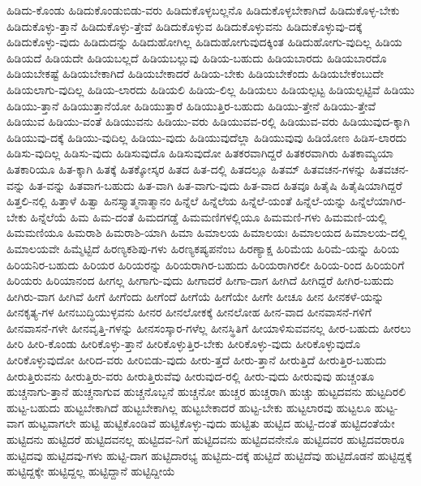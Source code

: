 {ಹಿಡಿದು-ಕೊಂಡು
ಹಿಡಿದುಕೊಂಡುಬಿಡು-ವರು
ಹಿಡಿದುಕೊಳ್ಳಬಲ್ಲನೊ
ಹಿಡಿದುಕೊಳ್ಳಬೇಕಾಗಿದೆ
ಹಿಡಿದುಕೊಳ್ಳ-ಬೇಕು
ಹಿಡಿದುಕೊಳ್ಳು-ತ್ತಾನೆ
ಹಿಡಿದುಕೊಳ್ಳು-ತ್ತೇವೆ
ಹಿಡಿದುಕೊಳ್ಳುವ
ಹಿಡಿದುಕೊಳ್ಳುವನು
ಹಿಡಿದುಕೊಳ್ಳುವು-ದಕ್ಕೆ
ಹಿಡಿದುಕೊಳ್ಳು-ವುದು
ಹಿಡಿದುದನ್ನು
ಹಿಡಿದುಹೋಗಿಲ್ಲ
ಹಿಡಿದುಹೋಗುವುದಕ್ಕಿಂತ
ಹಿಡಿದುಹೋಗು-ವುದಿಲ್ಲ
ಹಿಡಿಯ
ಹಿಡಿಯದೆ
ಹಿಡಿಯದೇ
ಹಿಡಿಯಬಲ್ಲದೆ
ಹಿಡಿಯಬಲ್ಲುವು
ಹಿಡಿಯ-ಬಹುದು
ಹಿಡಿಯಬಾರದು
ಹಿಡಿಯಬಾರದೊ
ಹಿಡಿಯಬೇಕಷ್ಟೆ
ಹಿಡಿಯಬೇಕಾಗಿದೆ
ಹಿಡಿಯಬೇಕಾದರೆ
ಹಿಡಿಯ-ಬೇಕು
ಹಿಡಿಯಬೇಕೆಂದು
ಹಿಡಿಯಬೇಕೆಂಬುದೇ
ಹಿಡಿಯಲಾಗು-ವುದಿಲ್ಲ
ಹಿಡಿಯ-ಲಾರದು
ಹಿಡಿಯಲಿ
ಹಿಡಿಯ-ಲಿಲ್ಲ
ಹಿಡಿಯಲು
ಹಿಡಿಯಲ್ಪಟ್ಟ
ಹಿಡಿಯಲ್ಪಟ್ಟಿವೆ
ಹಿಡಿಯು
ಹಿಡಿಯು-ತ್ತಾನೆ
ಹಿಡಿಯುತ್ತಾನೆಯೋ
ಹಿಡಿಯುತ್ತಾರೆ
ಹಿಡಿಯುತ್ತಿರ-ಬಹುದು
ಹಿಡಿಯು-ತ್ತೇನೆ
ಹಿಡಿಯು-ತ್ತೇವೆ
ಹಿಡಿಯುವ
ಹಿಡಿಯು-ವಂತೆ
ಹಿಡಿಯುವನು
ಹಿಡಿಯು-ವರು
ಹಿಡಿಯುವವ-ರಲ್ಲಿ
ಹಿಡಿಯುವ-ವರು
ಹಿಡಿಯುವುದ-ಕ್ಕಾಗಿ
ಹಿಡಿಯುವು-ದಕ್ಕೆ
ಹಿಡಿಯು-ವುದಿಲ್ಲ
ಹಿಡಿಯು-ವುದು
ಹಿಡಿಯುವುದೆಲ್ಲಾ
ಹಿಡಿಯುವುವು
ಹಿಡಿಯೋಣ
ಹಿಡಿಸ-ಲಾರದು
ಹಿಡಿಸು-ವುದಿಲ್ಲ
ಹಿಡಿಸು-ವುದು
ಹಿಡಿಸುವುದೊ
ಹಿಡಿಸುವುದೋ
ಹಿತಕರವಾಗಿದ್ದರೆ
ಹಿತಕರವಾಗಿರು
ಹಿತಕಾಮ್ಯಯಾ
ಹಿತಕಾರಿಯೂ
ಹಿತ-ಕ್ಕಾಗಿ
ಹಿತಕ್ಕೆ
ಹಿತಕ್ಕೋಸ್ಕರ
ಹಿತದ
ಹಿತ-ದಲ್ಲಿ
ಹಿತದಲ್ಲೂ
ಹಿತಮ್
ಹಿತವಚನ-ಗಳನ್ನು
ಹಿತವಚನ-ವನ್ನು
ಹಿತ-ವನ್ನು
ಹಿತವಾಗ-ಬಹುದು
ಹಿತ-ವಾಗಿ
ಹಿತ-ವಾಗು-ವುದು
ಹಿತ-ವಾದ
ಹಿತವೂ
ಹಿತೈಷಿ
ಹಿತೈಷಿಯಾಗಿದ್ದರೆ
ಹಿತ್ತಲಿ-ನಲ್ಲಿ
ಹಿತ್ತಾಳೆ
ಹಿತ್ವಾ
ಹಿನಸ್ತ್ಯಾತ್ಮನಾತ್ಮಾನಂ
ಹಿನ್ನೆಲೆ
ಹಿನ್ನೆಲೆಯ
ಹಿನ್ನೆಲೆ-ಯಂತೆ
ಹಿನ್ನೆಲೆ-ಯನ್ನು
ಹಿನ್ನೆಲೆಯಾಗಿರ-ಬೇಕು
ಹಿನ್ನೆಲೆಯೆ
ಹಿಮ
ಹಿಮ-ದಂತೆ
ಹಿಮದಗಡ್ಡೆ
ಹಿಮಮಣಿಗಳಲ್ಲಿಯೂ
ಹಿಮಮಣಿ-ಗಳು
ಹಿಮಮಣಿ-ಯಲ್ಲಿ
ಹಿಮಮಣಿಯೂ
ಹಿಮರಾಶಿ
ಹಿಮರಾಶಿ-ಯಾಗಿ
ಹಿಮಾ
ಹಿಮಾಲಯ
ಹಿಮಾಲಯಃ
ಹಿಮಾಲಯದ
ಹಿಮಾಲಯ-ದಲ್ಲಿ
ಹಿಮಾಲಯವೇ
ಹಿಮ್ಮೆಟ್ಟಿದೆ
ಹಿರಣ್ಯಕಶಿಪು-ಗಳು
ಹಿರಣ್ಯಕಷ್ಯಪನೆಂಬ
ಹಿರಣ್ಯಾಕ್ಷ
ಹಿರಿಮೆಯ
ಹಿರಿಮೆ-ಯನ್ನು
ಹಿರಿಯ
ಹಿರಿಯನಿರ-ಬಹುದು
ಹಿರಿಯರ
ಹಿರಿಯರನ್ನು
ಹಿರಿಯರಾಗಿರ-ಬಹುದು
ಹಿರಿಯರಾಗಿರಲೀ
ಹಿರಿಯ-ರಿಂದ
ಹಿರಿಯರಿಗೆ
ಹಿರಿಯರು
ಹಿರಿಯಾನಂದ
ಹೀಗಲ್ಲ
ಹೀಗಾಗು-ವುದು
ಹೀಗಾದರೆ
ಹೀಗಾ-ದಾಗ
ಹೀಗಿದೆ
ಹೀಗಿದ್ದರೆ
ಹೀಗಿರ-ಬಹುದು
ಹೀಗಿರು-ವಾಗ
ಹೀಗಿವೆ
ಹೀಗೆ
ಹೀಗೆಂದು
ಹೀಗೆಂದೆ
ಹೀಗೆಯೆ
ಹೀಗೆಯೇ
ಹೀಗೇ
ಹೀಚೂ
ಹೀನ
ಹೀನಕಳೆ-ಯನ್ನು
ಹೀನಕೃತ್ಯ-ಗಳ
ಹೀನಬುದ್ಧಿಯುಳ್ಳವನು
ಹೀನರ
ಹೀನಲೋಕಕ್ಕೆ
ಹೀನಲೋಹ
ಹೀನ-ವಾದ
ಹೀನವಾಸನೆ-ಗಳಿಗೆ
ಹೀನವಾಸನೆ-ಗಳೇ
ಹೀನವೃತ್ತಿ-ಗಳನ್ನು
ಹೀನಸಂಸ್ಕಾರ-ಗಳೆಲ್ಲ
ಹೀನಸ್ಥಿತಿಗೆ
ಹೀಯಾಳಿಸುವವನಲ್ಲ
ಹೀರ-ಬಹುದು
ಹೀರಲು
ಹೀರಿ
ಹೀರಿ-ಕೊಂಡು
ಹೀರಿಕೊಳ್ಳು-ತ್ತಾನೆ
ಹೀರಿಕೊಳ್ಳುತ್ತಿರ-ಬೇಕು
ಹೀರಿಕೊಳ್ಳು-ವುದು
ಹೀರಿಕೊಳ್ಳುವುದೊ
ಹೀರಿಕೊಳ್ಳುವುದೋ
ಹೀರಿದ-ವರು
ಹೀರಿಬಿಡು-ವುದು
ಹೀರು-ತ್ತದೆ
ಹೀರು-ತ್ತಾನೆ
ಹೀರುತ್ತಿದೆ
ಹೀರುತ್ತಿರ-ಬಹುದು
ಹೀರುತ್ತಿರುವನು
ಹೀರುತ್ತಿರು-ವರು
ಹೀರುತ್ತಿರುವೆವು
ಹೀರುವುದ-ರಲ್ಲಿ
ಹೀರು-ವುದು
ಹೀರುವುವು
ಹುಚ್ಚಂತೂ
ಹುಚ್ಚನಾಗು-ತ್ತಾನೆ
ಹುಚ್ಚನಾಗುವ
ಹುಚ್ಚನೊಬ್ಬನೆ
ಹುಚ್ಚನೋ
ಹುಚ್ಚರ
ಹುಚ್ಚರಾಗಿ
ಹುಚ್ಚು
ಹುಟ್ಟದವನು
ಹುಟ್ಟದಿರಲಿ
ಹುಟ್ಟ-ಬಹುದು
ಹುಟ್ಟಬೇಕಾಗಿದೆ
ಹುಟ್ಟಬೇಕಾಗಿಲ್ಲ
ಹುಟ್ಟಬೇಕಾದರೆ
ಹುಟ್ಟ-ಬೇಕು
ಹುಟ್ಟಲಾರವು
ಹುಟ್ಟಲೂ
ಹುಟ್ಟ-ವಾಗ
ಹುಟ್ಟವಾಗಲೇ
ಹುಟ್ಟಿ
ಹುಟ್ಟಿಕೊಂಡಿವೆ
ಹುಟ್ಟಿಕೊಳ್ಳು-ವುದು
ಹುಟ್ಟಿತು
ಹುಟ್ಟಿದ
ಹುಟ್ಟಿ-ದಂತೆ
ಹುಟ್ಟಿದಂತೆಯೇ
ಹುಟ್ಟಿದನು
ಹುಟ್ಟಿದರೆ
ಹುಟ್ಟಿದವನಲ್ಲ
ಹುಟ್ಟಿದವ-ನಿಗೆ
ಹುಟ್ಟಿದವನು
ಹುಟ್ಟಿದವನೇನೊ
ಹುಟ್ಟಿದವರ
ಹುಟ್ಟಿದವರಾರೂ
ಹುಟ್ಟಿದವು
ಹುಟ್ಟಿದವು-ಗಳು
ಹುಟ್ಟಿ-ದಾಗ
ಹುಟ್ಟಿದಾರಭ್ಯ
ಹುಟ್ಟಿದು-ದಕ್ಕೆ
ಹುಟ್ಟಿದೆ
ಹುಟ್ಟಿದೆವು
ಹುಟ್ಟಿದೊಡನೆ
ಹುಟ್ಟಿದ್ದಕ್ಕೆ
ಹುಟ್ಟಿದ್ದಕ್ಕೇ
ಹುಟ್ಟಿದ್ದಲ್ಲ
ಹುಟ್ಟಿದ್ದಾನೆ
ಹುಟ್ಟಿದ್ದೀಯೆ
}
